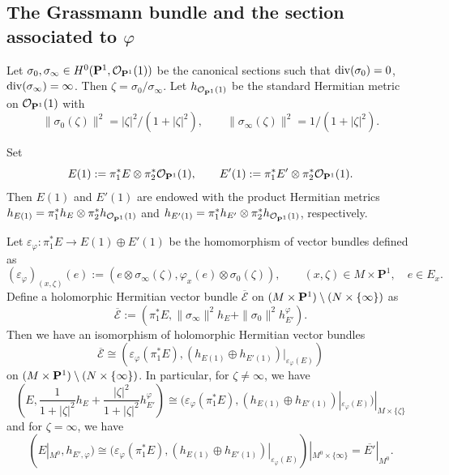 \documentclass[amscd, leqno]{amsart}
\theoremstyle{plain}
\theoremstyle{definition}
\theoremstyle{remark}
\begin{document}
\subsection
{The Grassmann bundle and the section associated to $\varphi$}
\label{sect:6.2}
\par
Let $\sigma_{0},\sigma_{\infty}\in H^{0}({\bf P}^{1},{\mathcal O}_{{\bf P}^{1}}(1))$ be the canonical sections such that
${\rm div}(\sigma_{0})=0$, ${\rm div}(\sigma_{\infty})=\infty$. Then $\zeta=\sigma_{0}/\sigma_{\infty}$. 
Let $h_{{\mathcal O}_{{\bf P}^{1}}(1)}$ be the standard Hermitian metric on ${\mathcal O}_{{\bf P}^{1}}(1)$ with
$$
\|\sigma_{0}(\zeta)\|^{2}=|\zeta|^{2}/(1+|\zeta|^{2}),
\qquad
\|\sigma_{\infty}(\zeta)\|^{2}=1/(1+|\zeta|^{2}).
$$
\par
Set 
$$
E(1) := \pi_{1}^{*}E\otimes\pi_{2}^{*}{\mathcal O}_{{\bf P}^{1}}(1),
\qquad
E'(1) := \pi_{1}^{*}E'\otimes\pi_{2}^{*}{\mathcal O}_{{\bf P}^{1}}(1).
$$
Then $E(1)$ and $E'(1)$ are endowed with the product Hermitian metrics 
$h_{E(1)} = \pi_{1}^{*}h_{E}\otimes\pi_{2}^{*}h_{{\mathcal O}_{{\bf P}^{1}}(1)}$ and 
$h_{E'(1)} = \pi_{1}^{*}h_{E'}\otimes\pi_{2}^{*}h_{{\mathcal O}_{{\bf P}^{1}}(1)}$, respectively. 
\par
Let $\varepsilon_{\varphi}\colon\pi_{1}^{*}E\to E(1)\oplus E'(1)$ be the homomorphism of vector bundles defined as
\begin{equation}
\label{eqn:hom:v.b.}
(\varepsilon_{\varphi})_{(x,\zeta)}(e) := (e\otimes\sigma_{\infty}(\zeta),\varphi_{x}(e)\otimes\sigma_{0}(\zeta)),
\qquad
(x,\zeta) \in M \times {\mathbf P}^{1},
\quad
e\in E_{x}.
\end{equation}
Define a holomorphic Hermitian vector bundle $\overline{\mathcal E}$ on $(M\times{\bf P}^{1})\setminus(N\times\{\infty\})$ as
$$
\overline{\mathcal E} := (\pi_{1}^{*}E,\|\sigma_{\infty}\|^{2}h_{E} + \|\sigma_{0}\|^{2}h_{E'}^{\varphi}).
$$
Then we have an isomorphism of holomorphic Hermitian vector bundles
$$
\overline{\mathcal E}\cong(\varepsilon_{\varphi}(\pi_{1}^{*}E), (h_{E(1)}\oplus h_{E'(1)})|_{\varepsilon_{\varphi}(E)})
$$
on $(M\times{\bf P}^{1})\setminus(N\times\{\infty\})$. In particular, for $\zeta\not=\infty$, we have
\begin{equation}
\label{eqn:vb}
\left(E,\frac{1}{1+|\zeta|^{2}}h_{E}+\frac{|\zeta|^{2}}{1+|\zeta|^{2}}h_{E'}^{\varphi}\right)
\cong
(\varepsilon_{\varphi}(\pi_{1}^{*}E),(h_{E(1)}\oplus h_{E'(1)})|_{\varepsilon_{\varphi}(E)})|_{M\times\{\zeta\}}
\end{equation}
and for $\zeta=\infty$, we have
$$
(E|_{M^{0}},h_{E',\varphi}) 
\cong 
(\varepsilon_{\varphi}(\pi_{1}^{*}E),(h_{E(1)}\oplus h_{E'(1)})|_{\varepsilon_{\varphi}(E)})|_{M^{0}\times\{\infty\}} 
= \overline{E'}|_{M^{0}}.
$$
\end{document}
